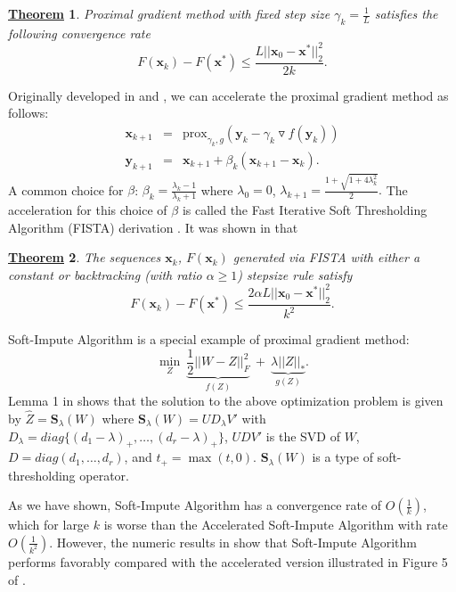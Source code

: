 \documentclass[12pt]{article}
\newcommand{\smc}{\twelvesmc}
\newtheorem{thm}{\underline{\smc Theorem}}
\begin{document}
\begin{thm}
	Proximal gradient method with fixed step size $\gamma_{k} = \frac{1}{L}$ satisfies the following convergence rate
	\begin{equation*}
	F(\bm{x}_{k}) - F(\bm{x}^{*}) \leq \frac{L||\bm{x}_{0}-\bm{x}^{*}||^{2}_{2}}{2k}.
	\end{equation*}
\end{thm}

Originally developed in \cite{nesterov2007gradient} and \cite{beck2009fast}, we can accelerate the proximal gradient method as follows:
\begin{eqnarray*}
\bm{x}_{k+1} &=& \text{prox}_{\gamma_{k}, g}(\bm{y}_{k}-\gamma_{k}\triangledown f(\bm{y}_{k})) \\
\bm{y}_{k+1} &=& \bm{x}_{k+1} +\beta_{k}(\bm{x}_{k+1}-\bm{x}_{k}).
\end{eqnarray*}
A common choice for $\beta$: $\beta_{k} = \frac{\lambda_{k}-1}{\lambda_{k}+1}$ where $\lambda_{0} = 0$, $\lambda_{k+1} = \frac{1+\sqrt{1+4\lambda^{2}_{k}}}{2}.$ The acceleration for this choice of $\beta$ is called the Fast Iterative Soft Thresholding Algorithm (FISTA) derivation \cite{beck2009fast}. It was shown in \cite{beck2009fast} that
\begin{thm}
	The sequences $\bm{x}_{k}$, $F(\bm{x}_{k})$ generated via FISTA with either a constant or backtracking (with ratio $\alpha \geq 1$) stepsize rule satisfy
	\begin{equation*}
	F(\bm{x}_{k}) - F(\bm{x}^{*}) \leq \frac{2\alpha L||\bm{x}_{0}-\bm{x}^{*}||^{2}_{2}}{k^{2}}.
	\end{equation*}
\end{thm}
Soft-Impute Algorithm is a special example of proximal gradient method:
\begin{equation*}
\underset{Z}{\min} ~\underbrace{\frac{1}{2}||W-Z||^{2}_{F}}_{f(Z)} ~+~\underbrace{\lambda||Z||_{*}}_{g(Z)}.
\end{equation*}
Lemma 1 in \cite{mazumder2010spectral} shows that the solution to the above optimization problem is  given by $\widehat{Z} = \bm{S}_{\lambda}(W)$ where  $\bm{S}_{\lambda}(W) = UD_{\lambda}V'$ with $D_{\lambda} = diag\{(d_{1}-\lambda)_{+}, \ldots, (d_{r}-\lambda)_{+}\}$,
$UDV'$ is the SVD of $W$, $D = diag(d_{1}, \ldots, d_{r})$, and $t_{+} = \max(t,0)$.  $\bm{S}_{\lambda}(W)$ is a type of soft-thresholding operator. 

As we have shown, Soft-Impute Algorithm has a convergence rate of $O\left(\frac{1}{k}\right)$, which for large $k$ is worse than the Accelerated Soft-Impute Algorithm with rate $O\left(\frac{1}{k^{2}}\right)$. However, the numeric results in \cite{mazumder2010spectral} show that Soft-Impute Algorithm performs favorably compared with the accelerated version illustrated in Figure 5 of \cite{mazumder2010spectral}.
\end{document}
